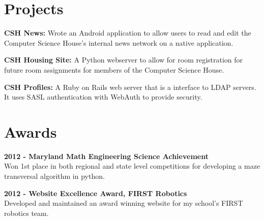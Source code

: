\documentclass[10pt]{article} %
\begin{document}
{\begin{minipage}[t]{0.44\textwidth}
\section{Projects}
    \begin{sloppypar}
        {\bf CSH News:} Wrote an Android application to allow users to read and edit 
        the Computer Science House's internal news network on a native application. \\
    \end{sloppypar} 
    \begin{sloppypar}
        {\bf CSH Housing Site:} A Python webserver to allow for room registration for
        future room assignments for members of the Computer Science House.\\
    \end{sloppypar}
    \begin{sloppypar}
        {\bf CSH Profiles:} A Ruby on Rails web server that is a interface to LDAP
        servers. It uses  SASL authentication with WebAuth to provide security. \\
    \end{sloppypar}
    

\section{Awards} 

\begin{sloppypar}
    {\bf 2012 - Maryland Math Engineering Science Achievement \\}Won 1st place in both regional and state level competitions for developing a maze transversal algorithm in python.
\end{sloppypar}

\bigskip

\begin{sloppypar}
    {\bf 2012 - Website Excellence Award, FIRST Robotics \\}Developed and maintained 
    an award winning website for my school's FIRST robotics team.
\end{sloppypar}

\bigskip


\end{minipage}}
\end{document}
